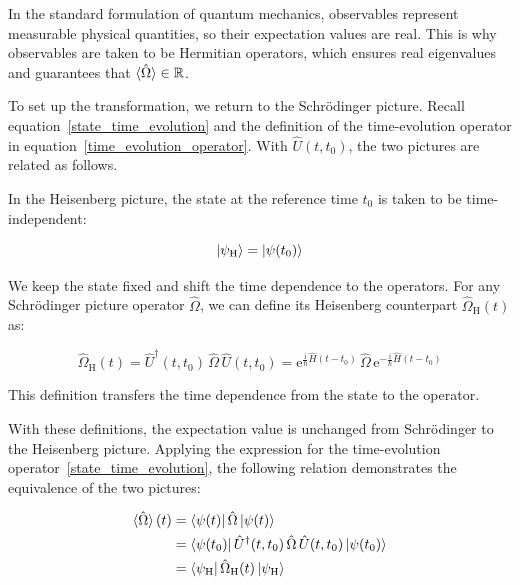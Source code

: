 In the standard formulation of quantum mechanics, observables represent measurable physical quantities, so their expectation values are real.
This is why observables are taken to be Hermitian operators, which ensures real eigenvalues and guarantees that $\braket{\hat{\Omega}}\in\mathbb{R}$.

To set up the transformation, we return to the Schrödinger picture.
Recall equation~\eqref{state_time_evolution} and the definition of the time-evolution operator in equation~\eqref{time_evolution_operator}.
With $\hat{U}(t,t_0)$, the two pictures are related as follows.

In the Heisenberg picture, the state at the reference time $t_0$ is taken to be time-independent:

\begin{equation}
    \ket{\psi_\mathrm{H}}=\ket{\psi(t_0)}
\label{heisenberg_state_definition}
\end{equation}

We keep the state fixed and shift the time dependence to the operators.
For any Schrödinger picture operator $\hat{\Omega}$, we can define its Heisenberg counterpart $\hat{\Omega}_\mathrm{H}(t)$ as:

\begin{equation}
    \hat\Omega_\mathrm{H}(t)
    =\hat{U}^\dagger(t,t_0)\,\hat{\Omega}\,\hat{U}(t,t_0)
    =\mathrm{e}^{\frac{\mathrm{i}}{\hbar}\hat{H}(t-t_0)}\,\hat{\Omega}\,\mathrm{e}^{-\frac{\mathrm{i}}{\hbar}\hat{H}(t-t_0)}
\label{heisenberg_operator_definition}
\end{equation}

This definition transfers the time dependence from the state to the operator.

With these definitions, the expectation value is unchanged from Schrödinger to the Heisenberg picture.
Applying the expression for the time-evolution operator~\eqref{state_time_evolution},
the following relation demonstrates the equivalence of the two pictures:

\begin{equation}
\begin{aligned}
    \braket{\hat{\Omega}}(t)&=\bra{\psi(t)}\hat{\Omega}\ket{\psi(t)}\\
    &=\bra{\psi(t_0)}\hat{U}^\dagger(t,t_0)\,\hat{\Omega}\,\hat{U}(t,t_0)\ket{\psi(t_0)} \\
    &=\bra{\psi_\mathrm{H}}\hat{\Omega}_\mathrm{H}(t)\ket{\psi_\mathrm{H}}
\end{aligned}
\label{equivalence_schrodinger_heisenberg}
\end{equation}

